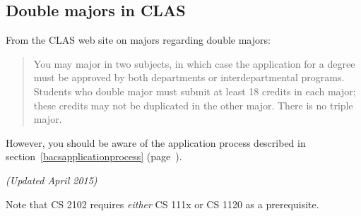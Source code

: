 \subsection{Double majors in CLAS}

From the CLAS web site on
majors
regarding double majors:

\begin{quotation}
\noindent You may major in two subjects, in which case the application
for a degree must be approved by both departments or inter\-departmental
programs. Students who double major must submit at least 18 credits in
each major; these credits may not be duplicated in the other
major. There is no triple major.
\end{quotation}

However, you should be aware of the application process described in
section~\ref{bacsapplicationprocess}
(page~\pageref{bacsapplicationprocess}).


\begin{figure*}[h!]
\label{fig:barequirementsflowchart}
{\em (Updated April 2015)}
\begin{center}
\end{center}
\end{figure*}

Note that CS 2102 requires {\em either} CS 111x or CS 1120 as a
prerequisite.
